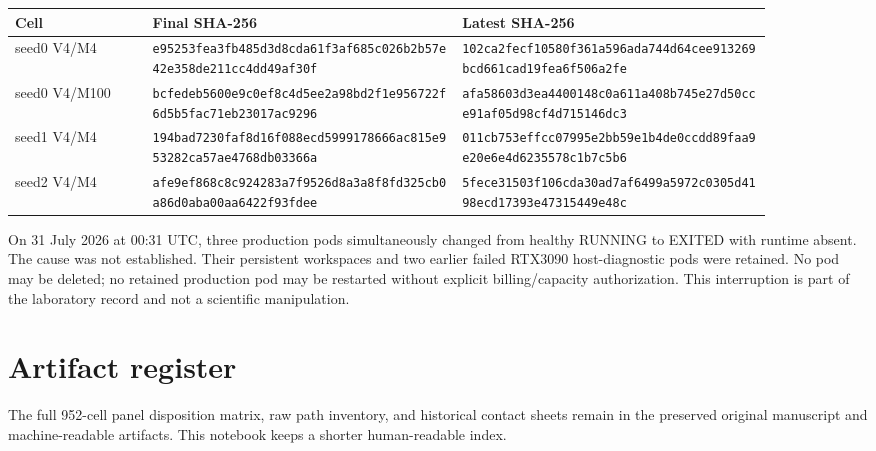 \documentclass[11pt]{article}
\begin{document}
\begingroup\scriptsize
\begin{longtable}{@{}L{0.16\linewidth}L{0.36\linewidth}L{0.36\linewidth}@{}}
\toprule
Cell & Final SHA-256 & Latest SHA-256\\
\midrule\endhead
seed0 V4/M4 & \texttt{e95253fea3fb485d3d8cda61f3af685\allowbreak c026b2b57e42e358de211cc4dd49af30f} & \texttt{102ca2fecf10580f361a596ada744d64\allowbreak cee913269bcd661cad19fea6f506a2fe}\\
seed0 V4/M100 & \texttt{bcfedeb5600e9c0ef8c4d5ee2a98bd2\allowbreak f1e956722f6d5b5fac71eb23017ac9296} & \texttt{afa58603d3ea4400148c0a611a408b74\allowbreak 5e27d50cce91af05d98cf4d715146dc3}\\
seed1 V4/M4 & \texttt{194bad7230faf8d16f088ecd599917866\allowbreak 6ac815e953282ca57ae4768db03366a} & \texttt{011cb753effcc07995e2bb59e1b4de0c\allowbreak cdd89faa9e20e6e4d6235578c1b7c5b6}\\
seed2 V4/M4 & \texttt{afe9ef868c8c924283a7f9526d8a3a8\allowbreak f8fd325cb0a86d0aba00aa6422f93fdee} & \texttt{5fece31503f106cda30ad7af6499a597\allowbreak 2c0305d4198ecd17393e47315449e48c}\\
\bottomrule
\end{longtable}
\endgroup

On 31 July 2026 at 00:31 UTC, three production pods simultaneously changed from healthy RUNNING to EXITED with runtime absent. The cause was not established. Their persistent workspaces and two earlier failed RTX3090 host-diagnostic pods were retained. No pod may be deleted; no retained production pod may be restarted without explicit billing/capacity authorization. This interruption is part of the laboratory record and not a scientific manipulation.

\section{Artifact register}
The full 952-cell panel disposition matrix, raw path inventory, and historical contact sheets remain in the preserved original manuscript and machine-readable artifacts. This notebook keeps a shorter human-readable index.
\end{document}
